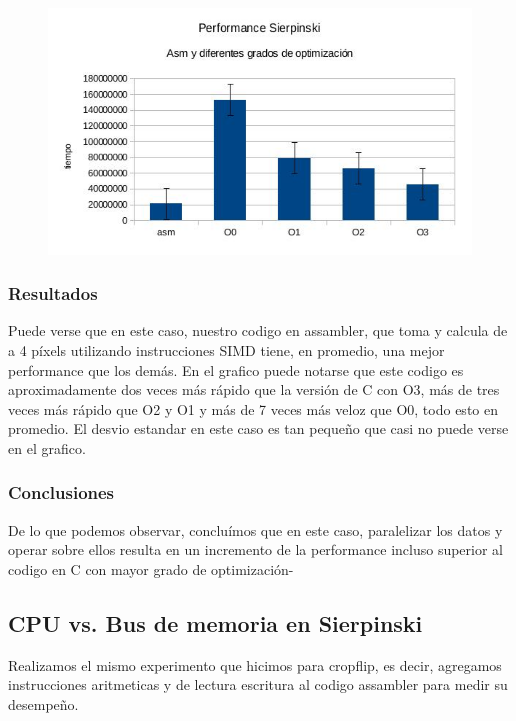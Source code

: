 \documentclass[a4paper]{article}
\begin{document}
\begin{figure}[h!]
  \begin{center}
  \includegraphics[scale=0.66]{Graficos1.4/sie/per.jpg}
  \label{nombreparareferenciar7}
  \end{center}
\end{figure}

\subsubsection{Resultados}
Puede verse que en este caso, nuestro codigo en assambler, que toma y calcula de a 4 píxels utilizando instrucciones SIMD tiene, en promedio, una mejor performance que los demás. En el grafico puede notarse que este codigo es aproximadamente dos veces más rápido que la versión de C con O3, más de tres veces más rápido que O2 y O1 y más de 7 veces más veloz que O0, todo esto en promedio. El desvio estandar en este caso es tan pequeño que casi no puede verse en el grafico.
\subsubsection{Conclusiones}

De lo que podemos observar, concluímos que en este caso, paralelizar los datos y operar sobre ellos resulta en un incremento de la performance incluso superior al codigo en C con mayor grado de optimización-

\newpage
\subsection{CPU vs. Bus de memoria en Sierpinski}

Realizamos el mismo experimento que hicimos para cropflip, es decir, agregamos instrucciones aritmeticas y de lectura escritura al codigo assambler para medir su desempeño.
\end{document}
